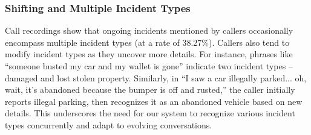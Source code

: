 
\subsubsection{Shifting and Multiple Incident Types}
Call recordings show that ongoing incidents mentioned by callers occasionally encompass multiple incident types (at a rate of 38.27\%). Callers also tend to modify incident types as they uncover more details. For instance, phrases like ``someone busted my car and my wallet is gone'' indicate two incident types – damaged and lost stolen property. Similarly, in ``I saw a car illegally parked... oh, wait, it's abandoned because the bumper is off and rusted,'' the caller initially reports illegal parking, then recognizes it as an abandoned vehicle based on new details. This underscores the need for our system to recognize various incident types concurrently and adapt to evolving conversations.


